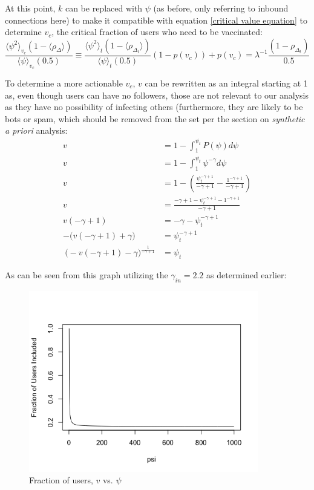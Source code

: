 \documentclass[preprint,review,12pt]{elsarticle}
\begin{document}
At this point, $k$ can be replaced with $\psi$ (as before, only referring to inbound connections here) to make it compatible with equation \ref{critical value equation} to determine $v_c$, the critical fraction of users who need to be vaccinated:
\begin{equation}
\label{v_c equation}
 \frac{\langle \psi^2 \rangle_{v_c}(1-\langle\rho_{\Delta}\rangle)}{\langle \psi \rangle_{v_c}(0.5)} \equiv \frac{\langle \psi^2 \rangle_{t}(1-\langle\rho_{\Delta_t}\rangle)}{\langle \psi \rangle_{t}(0.5)}(1-p(v_c))+p(v_c)=\lambda^{-1}\frac{(1-\rho_{\Delta_t})}{0.5}
\end{equation}

To determine a more actionable $v_c$, $v$ can be rewritten as an integral starting at 1 as, even though users can have no followers, those are not relevant to our analysis as they have no possibility of infecting others (furthermore, they are likely to be bots or spam, which should be removed from the set per the section on \textit{synthetic a priori} analysis:
\begin{equation}
\begin{split}
    v & = 1 - \int_1^{\psi_{t}} P(\psi)d\psi \\
   v & = 1 - \int_1^{\psi_{t}} \psi^{-\gamma}d\psi \\
   v & = 1 - \left(\frac{\psi_{t}^{-\gamma +1}}{-\gamma+1}-\frac{1^{-\gamma +1}}{-\gamma+1}\right) \\
   v & = \frac{-\gamma+1 - \psi_{t}^{-\gamma +1} -  1^{-\gamma +1}}{-\gamma+1} \\
   v(-\gamma + 1) & = -\gamma - \psi_{t}^{-\gamma +1}\\
   -\big(v(-\gamma + 1) + \gamma\big) & = \psi_{t}^{-\gamma+1}\\\
   \big(-v(-\gamma + 1) - \gamma\big)^{\frac{1}{-\gamma + 1}} & = \psi_t
\end{split}
\end{equation}

As can be seen from this graph utilizing the $\gamma_{in} = 2.2$ as determined earlier:
\begin{figure}[h]
 \centering
  \includegraphics[width=10cm]{Fraction of users included.png}
  \caption{Fraction of users, $v$ vs. $\psi$}\label{fig:Fraction of users,v, vs. $\psi$}
 \end{figure}
\end{document}
